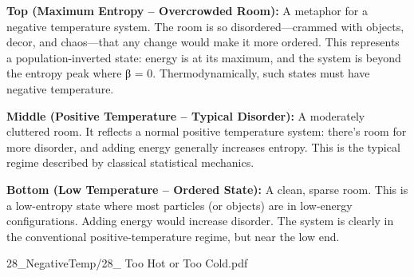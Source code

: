 \begin{SideNotePage}{
  \textbf{Top (Maximum Entropy – Overcrowded Room):}  
  A metaphor for a negative temperature system. The room is so disordered—crammed with objects, decor, and chaos—that any change would make it more ordered. This represents a population-inverted state: energy is at its maximum, and the system is beyond the entropy peak where β = 0. Thermodynamically, such states must have negative temperature. \par

  \textbf{Middle (Positive Temperature – Typical Disorder):}  
  A moderately cluttered room. It reflects a normal positive temperature system: there’s room for more disorder, and adding energy generally increases entropy. This is the typical regime described by classical statistical mechanics. \par

  \textbf{Bottom (Low Temperature – Ordered State):}  
  A clean, sparse room. This is a low-entropy state where most particles (or objects) are in low-energy configurations. Adding energy would increase disorder. The system is clearly in the conventional positive-temperature regime, but near the low end. \par

}{28_NegativeTemp/28_ Too Hot or Too Cold.pdf}
\end{SideNotePage}
